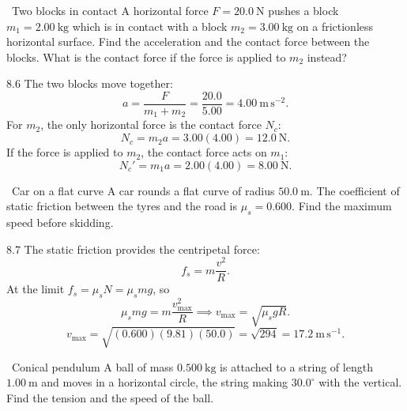 \begin{exercise}{\core\ Two blocks in contact}
A horizontal force $F=20.0\ \mathrm{N}$ pushes a block $m_1=2.00\ \mathrm{kg}$
which is in contact with a block $m_2=3.00\ \mathrm{kg}$ on a frictionless
horizontal surface. Find the acceleration and the contact force between the
blocks. What is the contact force if the force is applied to $m_2$ instead?
\end{exercise}

\begin{tabletworkspace}[6.5cm]
\end{tabletworkspace}

\begin{solution}{8.6}
The two blocks move together:
\[
a=\frac{F}{m_1+m_2}=\frac{20.0}{5.00}=4.00\ \mathrm{m\,s^{-2}}.
\]
For $m_2$, the only horizontal force is the contact force $N_c$:
\[
N_c=m_2a=3.00(4.00)=12.0\ \mathrm{N}.
\]
If the force is applied to $m_2$, the contact force acts on $m_1$:
\[
N_c'=m_1a=2.00(4.00)=8.00\ \mathrm{N}.
\]
\end{solution}

\begin{exercise}{\core\ Car on a flat curve}
A car rounds a flat curve of radius $50.0\ \mathrm{m}$. The coefficient of static
friction between the tyres and the road is $\mu_s=0.600$. Find the maximum speed
before skidding.
\end{exercise}

\begin{tabletworkspace}[6.5cm]
\end{tabletworkspace}

\begin{solution}{8.7}
The static friction provides the centripetal force:
\[
f_s=m\frac{v^2}{R}.
\]
At the limit $f_s=\mu_sN=\mu_smg$, so
\[
\mu_smg=m\frac{v_{\max}^2}{R}
\implies
v_{\max}=\sqrt{\mu_sgR}.
\]
\[
v_{\max}=\sqrt{(0.600)(9.81)(50.0)}=\sqrt{294}=17.2\ \mathrm{m\,s^{-1}}.
\]
\end{solution}

\begin{exercise}{\core\ Conical pendulum}
A ball of mass $0.500\ \mathrm{kg}$ is attached to a string of length
$1.00\ \mathrm{m}$ and moves in a horizontal circle, the string making
$30.0^\circ$ with the vertical. Find the tension and the speed of the ball.
\end{exercise}

\begin{tabletworkspace}[6.5cm]
\end{tabletworkspace}

